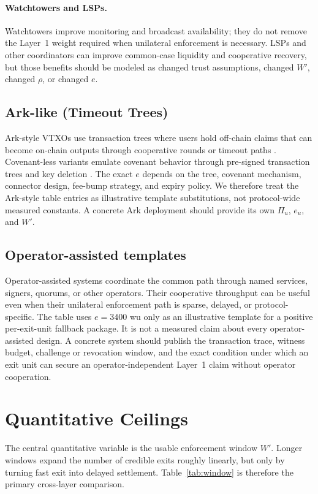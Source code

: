 \documentclass{article}
\theoremstyle{definition}
\begin{document}
\paragraph{Watchtowers and LSPs.}
Watchtowers improve monitoring and broadcast availability; they do not remove the Layer~1 weight required when unilateral enforcement is necessary. LSPs and other coordinators can improve common-case liquidity and cooperative recovery, but those benefits should be modeled as changed trust assumptions, changed $W'$, changed $\rho$, or changed $e$.

\subsection{Ark-like (Timeout Trees)}
Ark-style VTXOs use transaction trees where users hold off-chain claims that can become on-chain outputs through cooperative rounds or timeout paths \cite{ark,arkVtxo}. Covenant-less variants emulate covenant behavior through pre-signed transaction trees and key deletion \cite{arkClark}. The exact $e$ depends on the tree, covenant mechanism, connector design, fee-bump strategy, and expiry policy. We therefore treat the Ark-style table entries as illustrative template substitutions, not protocol-wide measured constants. A concrete Ark deployment should provide its own $\Pi_u$, $e_u$, and $W'$.

\subsection{Operator-assisted templates}
Operator-assisted systems coordinate the common path through named services, signers, quorums, or other operators. Their cooperative throughput can be useful even when their unilateral enforcement path is sparse, delayed, or protocol-specific. The table uses $e=3400$ wu only as an illustrative template for a positive per-exit-unit fallback package. It is not a measured claim about every operator-assisted design. A concrete system should publish the transaction trace, witness budget, challenge or revocation window, and the exact condition under which an exit unit can secure an operator-independent Layer~1 claim without operator cooperation.


\section{Quantitative Ceilings}
The central quantitative variable is the usable enforcement window $W'$. Longer windows expand the number of credible exits roughly linearly, but only by turning fast exit into delayed settlement. Table~\ref{tab:window} is therefore the primary cross-layer comparison.
\end{document}
